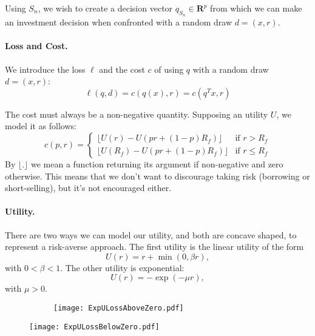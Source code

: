\documentclass[11pt]{article}
\newcommand{\real}{\bm R}
\theoremstyle{plain}
\theoremstyle{definition}
\begin{document}
Using $S_n$, we wish to create a decision vector $q_{S_n}\in\real^p$ from which we can
make an investment decision when confronted with a random draw $d=(x,r)$.

\paragraph{Loss and Cost.}
We introduce the loss $\ell$ and the cost $c$ of using $q$ with a random draw $d=(x,r)$:
\begin{equation}
\ell(q,d) = c(q(x),r) = c(q^Tx,r)
\end{equation}

The cost must always be a non-negative quantity. Supposing an utility $U$, we model it as
follows:
\begin{equation}
  c(p,r) =
  \begin{cases}
    \lfloor U(r) - U(pr + (1-p)R_f)\rfloor & \text{if } r>R_f\\
    \lfloor U(R_f) - U(pr + (1-p)R_f)\rfloor &\text{if } r\leq R_f
  \end{cases}
\end{equation}
By $\lfloor . \rfloor$ we mean a function returning its argument if non-negative and zero
otherwise. This means that we don't want to discourage taking risk (borrowing or
short-selling), but it's not encouraged either.

\paragraph{Utility.}
There are two ways we can model our utility, and both are concave shaped, to represent a
risk-averse approach. The first utility is the linear utility of the form
\begin{equation}
  U(r) = r + \min(0, \beta r),
\end{equation}
with $0<\beta<1$. The other utility is exponential:
\begin{equation}
  U(r) = -\exp(-\mu r),
\end{equation}
with $\mu > 0$.

\begin{figure}
  \centering
  \begin{subfigure}{.4\textwidth}
  \texttt{[image: ExpULossAboveZero.pdf]}
\end{subfigure}%
\begin{minipage}{.4\textwidth}
  \texttt{[image: ExpULossBelowZero.pdf]}
\end{minipage}
\end{figure}
\end{document}

